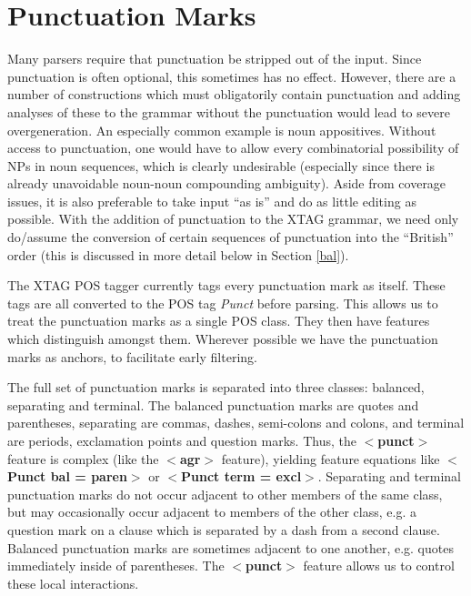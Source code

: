  
\chapter{Punctuation Marks} 
\label{punct-chapt} 
 
Many parsers require that punctuation be stripped out of the 
input. Since punctuation is often optional, this sometimes has no 
effect. However, there are a number of constructions which must 
obligatorily contain punctuation and adding analyses of these to the 
grammar without the punctuation would lead to severe 
overgeneration. An especially common example is noun 
appositives. Without access to punctuation, one would have to allow 
every combinatorial possibility of NPs in noun sequences, which is 
clearly undesirable (especially since there is already unavoidable 
noun-noun compounding ambiguity). Aside from coverage issues, it is 
also preferable to take input ``as is'' and do as little editing as 
possible. With the addition of punctuation to the XTAG grammar, we 
need only do/assume the conversion of certain sequences of punctuation 
into the ``British'' order (this is discussed in more detail below in 
Section \ref{bal}). 
 
The XTAG POS tagger currently tags every punctuation mark as 
itself. These tags are all converted to the POS tag {\it Punct} before 
parsing. This allows us to treat the punctuation marks as a single POS 
class. They then have features which distinguish amongst them. 
Wherever possible we have the punctuation marks as anchors, to 
facilitate early filtering. 
 
The full set of punctuation marks is separated into three classes: 
balanced, separating and terminal. The balanced punctuation marks are 
quotes and parentheses, separating are commas, dashes, semi-colons and 
colons, and terminal are periods, exclamation points and question 
marks. Thus, the {\bf $<$punct$>$} feature is complex (like the {\bf $<$agr$>$} feature), yielding feature equations like {\bf $<$Punct bal = paren$>$} or {\bf $<$Punct term = excl$>$}. Separating and terminal 
punctuation marks do not occur adjacent to other members of the same 
class, but may occasionally occur adjacent to members of the other 
class, e.g. a question mark on a clause which is separated by a dash 
from a second clause. Balanced punctuation marks are sometimes adjacent 
to one another, e.g. quotes immediately inside of parentheses. The 
{\bf $<$punct$>$} feature allows us to control these local 
interactions. 
 
